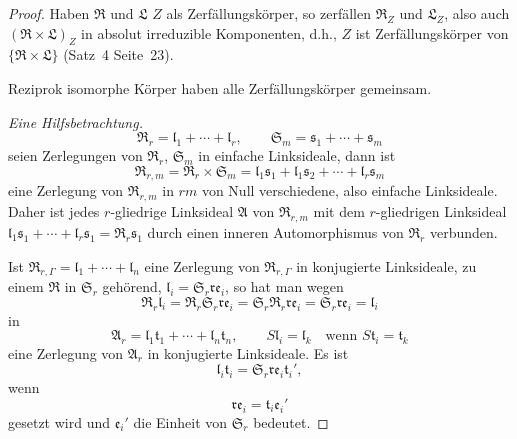 \documentclass[12pt,a4paper]{article}
\theoremstyle{plain}
\theoremstyle{definition}
\theoremstyle{remark}
\begin{document}
\begin{proof}
Haben $\mathfrak{R}$ und $\mathfrak{L}$ $Z$ als Zerf\"allungsk\"orper, so zerf\"allen
$\mathfrak{R}_{Z}$ und $\mathfrak{L}_{Z}$, also auch $(\mathfrak{R} \times \mathfrak{L})_{Z}$ in absolut irreduzible Komponenten,
d.h., $Z$ ist Zerf\"allungsk\"orper von $\{\mathfrak{R} \times \mathfrak{L}\}$ (Satz~4 Seite~23).

Reziprok isomorphe K\"orper haben alle Zerf\"allungsk\"orper gemeinsam.

\textit{Eine Hilfsbetrachtung.}
\[
\mathfrak{R}_{r} = \mathfrak{l}_{1} + \cdots + \mathfrak{l}_{r}, \qquad
\mathfrak{S}_{m} = \mathfrak{s}_{1} + \cdots + \mathfrak{s}_{m}
\]
seien Zerlegungen von $\mathfrak{R}_{r}$, $\mathfrak{S}_{m}$ in einfache Linksideale, dann ist
\[
\mathfrak{R}_{r,m} = \mathfrak{R}_{r} \times \mathfrak{S}_{m}
= \mathfrak{l}_{1}\mathfrak{s}_{1} + \mathfrak{l}_{1}\mathfrak{s}_{2} + \cdots + \mathfrak{l}_{r}\mathfrak{s}_{m}
\]
eine Zerlegung von $\mathfrak{R}_{r,m}$ in $rm$ von Null verschiedene, also einfache
Linksideale. Daher ist jedes $r$-gliedrige Linksideal $\mathfrak{A}$ von $\mathfrak{R}_{r,m}$ mit dem
$r$-gliedrigen Linksideal $\mathfrak{l}_{1}\mathfrak{s}_{1} + \cdots + \mathfrak{l}_{r}\mathfrak{s}_{1} = \mathfrak{R}_{r}\mathfrak{s}_{1}$ durch einen inneren
Automorphismus von $\mathfrak{R}_{r}$ verbunden.

Ist $\mathfrak{R}_{r,\varGamma} = \mathfrak{l}_{1} + \cdots + \mathfrak{l}_{n}$ eine Zerlegung von $\mathfrak{R}_{r,\varGamma}$ in
konjugierte Linksideale, zu einem $\mathfrak{R}$ in $\mathfrak{S}_{r}$ geh\"orend,
$\mathfrak{l}_{i} = \mathfrak{S}_{r}\mathfrak{r}\mathfrak{e}_{i}$, so hat man wegen
\[
\mathfrak{R}_{r}\mathfrak{l}_{i} = \mathfrak{R}_{r}\mathfrak{S}_{r}\mathfrak{r}\mathfrak{e}_{i} = \mathfrak{S}_{r}\mathfrak{R}_{r}\mathfrak{r}\mathfrak{e}_{i}
= \mathfrak{S}_{r}\mathfrak{r}\mathfrak{e}_{i} = \mathfrak{l}_{i}
\]
in
\begin{equation}\label{eq:24-1}
\mathfrak{A}_{r} = \mathfrak{l}_{1}\mathfrak{t}_{1} + \cdots + \mathfrak{l}_{n}\mathfrak{t}_{n}, \qquad
S\mathfrak{l}_{i} = \mathfrak{l}_{k} \quad \text{wenn } S\mathfrak{t}_{i} = \mathfrak{t}_{k}
\end{equation}
eine Zerlegung von $\mathfrak{A}_{r}$ in konjugierte Linksideale. Es ist
\[
\mathfrak{l}_{i}\mathfrak{t}_{i} = \mathfrak{S}_{r}\mathfrak{r}\mathfrak{e}_{i}\mathfrak{t}_{i}',
\]
wenn
\[
\mathfrak{r}\mathfrak{e}_{i} = \mathfrak{t}_{i}\mathfrak{e}_{i}'
\]
gesetzt wird und $\mathfrak{e}_{i}'$ die Einheit von $\mathfrak{S}_{r}$ bedeutet.


\end{proof}
\end{document}

